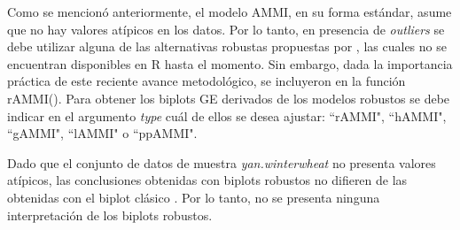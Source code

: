 

Como se mencionó anteriormente, el modelo AMMI, en su forma estándar, asume que no hay valores atípicos en los datos. Por lo tanto, en presencia de \emph{outliers} se debe utilizar alguna de las alternativas robustas propuestas por \citet{Rodriguesetal2016}, las cuales no se encuentran disponibles en R hasta el momento. Sin embargo, dada la importancia práctica de este reciente avance metodológico, se incluyeron en la función \textcolor{fandango}{rAMMI()}. Para obtener los biplots GE derivados de los modelos robustos se debe indicar en el argumento \emph{type} cuál de ellos se desea ajustar: ``rAMMI", ``hAMMI", ``gAMMI", ``lAMMI" o ``ppAMMI".

Dado que el conjunto de datos de muestra \emph{yan.winterwheat} no presenta valores atípicos, las conclusiones obtenidas con biplots robustos no difieren de las obtenidas con el biplot clásico \citep{Rodriguesetal2016}. Por lo tanto, no se presenta ninguna interpretación de los biplots robustos. \\


